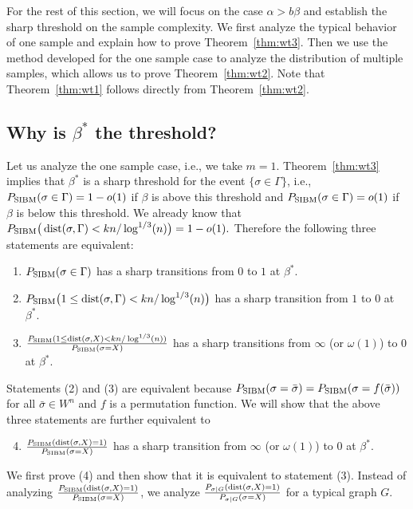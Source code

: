 \documentclass{article}
\begin{document}
For the rest of this section, we will focus on the case $\alpha>b\beta$ and establish the sharp threshold on the sample complexity. We first analyze the typical behavior of one sample and explain how to prove Theorem~\ref{thm:wt3}. Then we use the method developed for the one sample case to analyze the distribution of multiple samples, which allows us to prove Theorem~\ref{thm:wt2}. Note that Theorem~\ref{thm:wt1} follows directly from Theorem~\ref{thm:wt2}.

\subsection{Why is $\beta^\ast$ the threshold?} \label{sect:why}

Let us analyze the one sample case, i.e., we take $m=1$.
Theorem~\ref{thm:wt3} implies that $\beta^\ast$ is a sharp threshold for the event $\{\sigma \in \Gamma\}$, i.e., $P_{\operatorname{SIBM}}(\sigma\in \Gamma)=1-o(1)$ if $\beta$ is above this threshold and $P_{\operatorname{SIBM}}(\sigma\in \Gamma)=o(1)$ if $\beta$ is below this threshold.
We already know that
$
P_{\operatorname{SIBM}} \big(\operatorname{dist}(\sigma, \Gamma)< kn/\log^{1/3}(n) \big) = 1- o(1) .
$
Therefore the following three statements are equivalent:
\begin{enumerate}[label=(\arabic*)]
\item $P_{\operatorname{SIBM}}(\sigma\in \Gamma)$ has a sharp transitions from $0$ to $1$ at $\beta^\ast$.
\item $P_{\operatorname{SIBM}} \big( 1\le \operatorname{dist}(\sigma,\Gamma)< kn/\log^{1/3}(n) \big)$ has a sharp transition from $1$ to $0$ at $\beta^\ast$.
\item $\frac{P_{\operatorname{SIBM}} ( 1\le \operatorname{dist}(\sigma, X)< kn/\log^{1/3}(n) )}{P_{\operatorname{SIBM}}(\sigma= X)}$ has a sharp transitions from $\infty$ (or $\omega(1)$) to $0$ at $\beta^\ast$.
\end{enumerate}
Statements (2) and (3) are equivalent because $P_{\operatorname{SIBM}}(\sigma=\bar{\sigma})=P_{\operatorname{SIBM}}(\sigma=f(\bar{\sigma}))$ for all $\bar{\sigma}\in W^n$ and $f$ is a permutation function.
We will show that the above three statements are further equivalent to
\begin{enumerate}[label=(\arabic*)]
\setcounter{enumi}{3}
  \item  $\frac{P_{\operatorname{SIBM}} ( \operatorname{dist}(\sigma, X) = 1 )}{P_{\operatorname{SIBM}}(\sigma= X)}$ has a sharp transition from $\infty$ (or $\omega(1)$) to $0$ at $\beta^\ast$.
\end{enumerate}
We first prove (4) and then show that it is equivalent to statement (3).
Instead of analyzing $\frac{P_{\operatorname{SIBM}} ( \operatorname{dist}(\sigma, X) = 1 )}{P_{\operatorname{SIBM}}(\sigma= X)}$, we analyze $\frac{P_{\sigma|G} ( \operatorname{dist}(\sigma, X) = 1 )}{P_{\sigma|G}(\sigma= X)}$ for a typical graph $G$.
\end{document}
